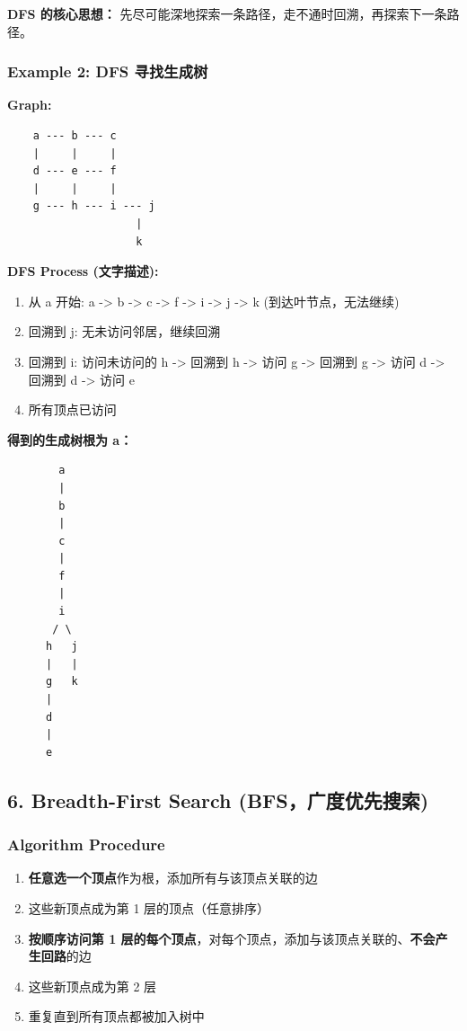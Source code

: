 \documentclass[10pt,a4paper,openany]{ctexbook}
\theoremstyle{definition}
\theoremstyle{remark}
\renewenvironment{quote}
  {\list{}{\leftmargin=1em\rightmargin=0pt\topsep=0.5pt\partopsep=0pt}\item[]}
  {\endlist}
\begin{document}
\begin{quote}
\textbf{DFS 的核心思想：} 先尽可能深地探索一条路径，走不通时回溯，再探索下一条路径。

\end{quote}

\subsubsection{Example 2: DFS 寻找生成树}

\textbf{Graph:}
{\footnotesize\begin{verbatim}
    a --- b --- c
    |     |     |
    d --- e --- f
    |     |     |
    g --- h --- i --- j
                    |
                    k
\end{verbatim}}

\textbf{DFS Process (文字描述):}
\begin{enumerate}
\item 从 a 开始: a -> b -> c -> f -> i -> j -> k (到达叶节点，无法继续)
\item 回溯到 j: 无未访问邻居，继续回溯
\item 回溯到 i: 访问未访问的 h -> 回溯到 h -> 访问 g -> 回溯到 g -> 访问 d -> 回溯到 d -> 访问 e
\item 所有顶点已访问

\end{enumerate}

\textbf{得到的生成树根为 a：}
{\footnotesize\begin{verbatim}
        a
        |
        b
        |
        c
        |
        f
        |
        i
       / \
      h   j
      |   |
      g   k
      |
      d
      |
      e
\end{verbatim}}

\vspace{-2pt}

\subsection{6. Breadth-First Search (BFS，广度优先搜索)}

\subsubsection{Algorithm Procedure}

\begin{enumerate}
\item \textbf{任意选一个顶点}作为根，添加所有与该顶点关联的边
\item 这些新顶点成为第 1 层的顶点（任意排序）
\item \textbf{按顺序访问第 1 层的每个顶点}，对每个顶点，添加与该顶点关联的、\textbf{不会产生回路}的边
\item 这些新顶点成为第 2 层
\item 重复直到所有顶点都被加入树中

\end{enumerate}
\end{document}
